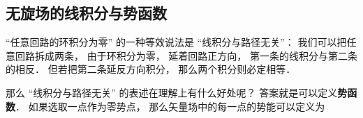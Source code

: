 \subsection{无旋场的线积分与势函数}
“任意回路的环积分为零” 的一种等效说法是 “线积分与路径无关”： 我们可以把任意回路拆成两条， 由于环积分为零， 延着回路正方向， 第一条的线积分与第二条的相反． 但若把第二条延反方向积分， 那么两个积分则必定相等．

那么 “线积分与路径无关” 的表述在理解上有什么好处呢？ 答案就是可以定义\textbf{势函数}． 如果选取一点作为零势点， 那么矢量场中的每一点的势能可以定义为
